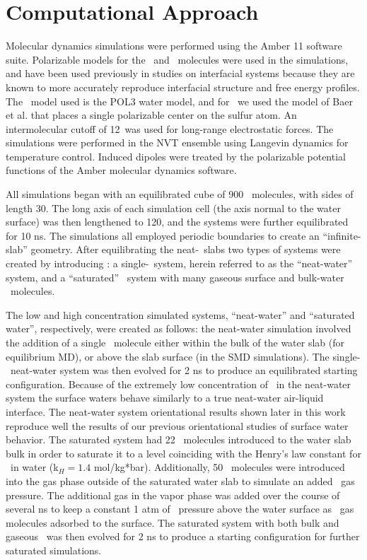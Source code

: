 \section{Computational Approach}

Molecular dynamics simulations were performed using the Amber 11 software suite.\cite{Case2010} Polarizable models for the \wat~and \suldiox~molecules were used in the simulations, and have been used previously in studies on interfacial systems because they are known to more accurately reproduce interfacial structure and free energy profiles.\cite{Wick2007,Rivera2006,Dang1998} The \wat~model used is the POL3 water model,\cite{Caldwell1995} and for \suldiox~we used the model of Baer et al. that places a single polarizable center on the sulfur atom.\cite{Baer2010} An intermolecular cutoff of 12\angs~was used for long-range electrostatic forces. The simulations were performed in the NVT ensemble using Langevin dynamics for temperature control. Induced dipoles were treated by the polarizable potential functions of the Amber molecular dynamics software.

All simulations began with an equilibrated cube of 900 \wat~molecules, with sides of length 30\angs. The long axis of each simulation cell (the axis normal to the water surface) was then lengthened to 120\angs, and the systems were further equilibrated for 10 ns. The simulations all employed periodic boundaries to create an ``infinite-slab'' geometry. After equilibrating the neat-\wat~slabs two types of systems were created by introducing \suldiox: a single-\suldiox~system, herein referred to as the ``neat-water'' system, and a ``saturated'' \suldiox~system with many gaseous surface and bulk-water \suldiox~molecules.

The low and high concentration simulated systems, ``neat-water'' and ``saturated water'', respectively, were created as follows: the neat-water simulation involved the addition of a single \suldiox~molecule either within the bulk of the water slab (for equilibrium MD), or above the slab surface (in the SMD simulations). The single-\suldiox~neat-water system was then evolved for 2 ns to produce an equilibrated starting configuration. Because of the extremely low concentration of \suldiox~in the neat-water system the surface waters behave similarly to a true neat-water air-liquid interface. The neat-water system orientational results shown later in this work reproduce well the results of our previous orientational studies of surface water behavior.\cite{Walker2006b,Hore2008} The saturated system had 22 \suldiox~molecules introduced to the water slab bulk in order to saturate it to a level coinciding with the Henry's law constant for \suldiox~in water (k\textdegree$_H = 1.4$ mol/kg*bar).\cite{Lide2000} Additionally, 50 \suldiox~molecules were introduced into the gas phase outside of the saturated water slab to simulate an added \suldiox~gas pressure. The additional gas in the vapor phase was added over the course of several ns to keep a constant 1 atm of \suldiox~pressure above the water surface as \suldiox~gas molecules adsorbed to the surface. The saturated system with both bulk and gaseous \suldiox~was then evolved for 2 ns to produce a starting configuration for further saturated simulations.

